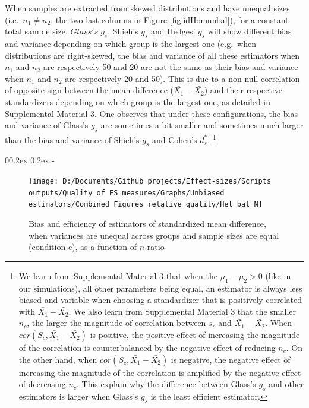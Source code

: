 \documentclass[
  english,
  man,floatsintext]{apa6}
\makeatletter
\let\oldsubparagraph\subparagraph
\renewcommand{\subparagraph}[1]{\oldsubparagraph{#1}\mbox{}}
\renewcommand{\subparagraph}[1]{\@startsection{subparagraph}{5}{1em}%
  {0\baselineskip \@plus 0.2ex \@minus 0.2ex}%
  {-\z@\relax}%
  {\normalfont\normalsize\itshape\hspace{\parindent}{#1}\textit{\addperi}}{\relax}}
\makeatother
\begin{document}
When samples are extracted from skewed distributions and have unequal sizes (i.e.~\(n_1 \neq n_2\), the two last columns in Figure \ref{fig:idHomunbal}), for a constant total sample size, \(Glass's \; g_s\), Shieh's \(g_s\) and Hedges' \(g_s\) will show different bias and variance depending on which group is the largest one (e.g.~when distributions are right-skewed, the bias and variance of all these estimators when \(n_1\) and \(n_2\) are respectively 50 and 20 are not the same as their bias and variance when \(n_1\) and \(n_2\) are respectively 20 and 50). This is due to a non-null correlation of opposite sign between the mean difference (\(\bar{X_1}-\bar{X_2}\)) and their respective standardizers depending on which group is the largest one, as detailed in Supplemental Material 3. One observes that under these configurations, the bias and variance of Glass's \(g_s\) are sometimes a bit smaller and sometimes much larger than the bias and variance of Shieh's \(g_s\) and Cohen's \(d^*_s\). \footnote{We learn from Supplemental Material 3 that when the $\mu_1-\mu_2 >0$ (like in our simulations), all other parameters being equal, an estimator is always less biased and variable when choosing a standardizer that is positively correlated with $\bar{X_1}-\bar{X_2}$. We also learn from Supplemental Material 3 that the smaller $n_c$, the larger the magnitude of correlation between $s_c$ and $\bar{X_1}-\bar{X_2}$. When $cor(S_c,\bar{X_1}-\bar{X_2})$ is positive, the positive effect of increasing the magnitude of the correlation is counterbalanced by the negative effect of reducing $n_c$. On the other hand, when $cor(S_c,\bar{X_1}-\bar{X_2})$ is negative, the negative effect of increasing the magnitude of the correlation is amplified by the negative effect of decreasing $n_c$. This explain why the difference between Glass's $g_s$ and other estimators is larger when Glass's $g_s$ is the least efficient estimator.}

\hypertarget{when-variances-are-unequal-across-groups}{%
\subparagraph{When variances are unequal across groups}\label{when-variances-are-unequal-across-groups}}

\begin{figure}

{\centering \texttt{[image: D:/Documents/Github\_projects/Effect-sizes/Scripts outputs/Quality of ES measures/Graphs/Unbiased estimators/Combined Figures\_relative quality/Het\_bal\_N]} 

}

\caption{Bias and efficiency of estimators of standardized mean difference, when variances are unequal across groups and sample sizes are equal (condition c), as a function of $n$-ratio}\label{fig:idHetbal1}
\end{figure}
\end{document}
